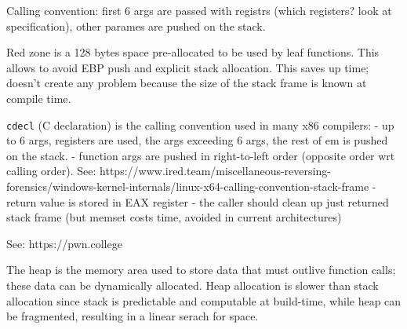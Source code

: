 Calling convention: first 6 args are passed with registrs (which registers? look at specification), other parames are pushed on the stack.

Red zone is a 128 bytes space pre-allocated to be used by leaf functions. This allows to avoid EBP push and explicit stack allocation.
This saves up time; doesn't create any problem because the size of the stack frame is known at compile time.

\texttt{cdecl} (C declaration) is the calling convention used in many x86 compilers:
- up to 6 args, registers are used, the args exceeding 6 args, the rest of em is pushed on the stack.
- function args are pushed in right-to-left order (opposite order wrt calling order). See: https://www.ired.team/miscellaneous-reversing-forensics/windows-kernel-internals/linux-x64-calling-convention-stack-frame
- return value is stored in EAX register
- the caller should clean up just returned stack frame (but memset costs time, avoided in current architectures)

See: https://pwn.college

The heap is the memory area used to store data that must outlive function calls; these data can be dynamically allocated.
Heap allocation is slower than stack allocation since stack is predictable and computable at build-time, while heap can be fragmented, resulting in a linear serach for space.

